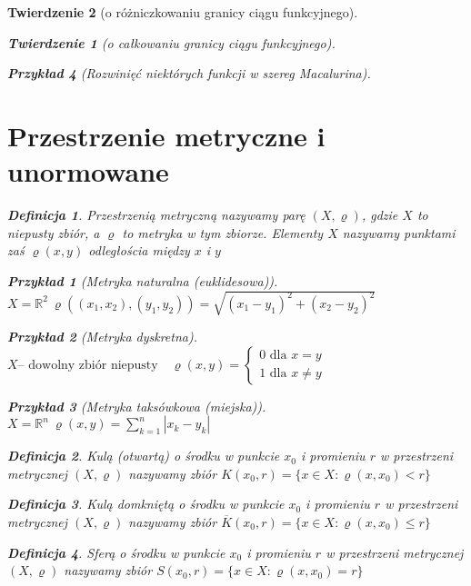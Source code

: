 \documentclass[12pt,a4paper]{article}
\newtheorem{tw}{Twierdzenie}
\newtheorem{przyklad}{Przykład}
\theoremstyle{definition}
\newtheorem{df}{Definicja}
\begin{document}
\begin{tw}[o różniczkowaniu granicy ciągu funkcyjnego]
\begin{tw}[o całkowaniu granicy ciągu funkcyjnego]
\begin{przyklad}[Rozwinięć niektórych funkcji w szereg Macalurina]
\section{Przestrzenie metryczne i unormowane}
\begin{df}
Przestrzenią metryczną nazywamy parę $(X, \varrho)$, gdzie $X$ to niepusty zbiór, a $\varrho$ to metryka w tym zbiorze. Elementy $X$ nazywamy punktami zaś $\varrho (x,y)$ odległościa między $x$ i $y$ 
\end{df}
\begin{przyklad}[Metryka naturalna (euklidesowa)]
$X = \mathbb{R}^2 ~\varrho((x_1,x_2),(y_1, y_2)) = \sqrt{(x_1-y_1)^2+(x_2-y_2)^2}$
\end{przyklad}
\begin{przyklad}[Metryka dyskretna]
$X \mbox{-- dowolny zbiór niepusty} \quad \varrho(x,y) = 
\begin{cases}
0 \mbox{ dla } x = y\\
1 \mbox{ dla } x \neq y
\end{cases}$
\end{przyklad}
\begin{przyklad}[Metryka taksówkowa (miejska)]
$X = \mathbb{R}^n ~\varrho(x, y) = \sum\limits_{k=1}^n |x_k-y_k|$
\end{przyklad}

\begin{df}
Kulą (otwartą) o środku w punkcie $x_0$ i promieniu $r$ w przestrzeni metrycznej $(X, \varrho)$ nazywamy zbiór $K(x_0, r) = \{x\in X: \varrho(x,x_0) < r\}$
\end{df}
\begin{df}
Kulą domkniętą o środku w punkcie $x_0$ i promieniu $r$ w przestrzeni metrycznej $(X, \varrho)$ nazywamy zbiór $\overline{K}(x_0, r) = \{x\in X: \varrho(x,x_0) \leqslant r\}$
\end{df}
\begin{df}
Sferą o środku w punkcie $x_0$ i promieniu $r$ w przestrzeni metrycznej $(X, \varrho)$ nazywamy zbiór $S(x_0, r) = \{x\in X: \varrho(x,x_0) = r\}$
\end{df}


\end{przyklad}
\end{tw}
\end{tw}
\end{document}

